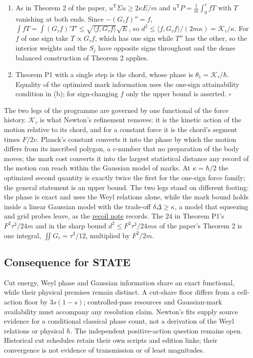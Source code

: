 \documentclass[11pt,a4paper]{article}
\begin{document}
\begin{enumerate}
\def\labelenumi{(\alph{enumi})}
\setcounter{enumi}{1}
\item
  As in Theorem 2 of the paper, \(u^{\mathsf T}\Sigma u\ge2\kappa E/m\)
  and \(u^{\mathsf T}P=\frac1m\int_0^\tau fT\) with \(T\) vanishing at
  both ends. Since \(-(G_\tau f)''=f\),
  \(\int fT=\int(G_\tau f)'T'\le\sqrt{\langle f,G_\tau f\rangle}\sqrt E\),
  so
  \(d^2\le\langle f,G_\tau f\rangle/(2m\kappa)=\mathcal K_\tau/\kappa\).
  For \(f\) of one sign take \(T\propto G_\tau f\), which has one sign
  while \(T''\) has the other, so the interior weights and the \(S_j\)
  have opposite signs throughout and the dense balanced construction of
  Theorem 2 applies.
\item
  Theorem P1 with a single step is the chord, whose phase is
  \(\theta_1=\mathcal K_\tau/\hbar\). Equality of the optimized mark
  information uses the one-sign attainability condition in (b); for
  sign-changing \(f\) only the upper bound is asserted. \(\square\)
\end{enumerate}

The two legs of the programme are governed by one functional of the
force history. \(\mathcal K_\tau\) is what Newton's refinement removes:
it is the kinetic action of the motion relative to its chord, and for a
constant force it is the chord's segment times \(F/2v\). Planck's
constant converts it into the phase by which the motion differs from its
inscribed polygon, a c-number that no preparation of the body moves; the
mark cost converts it into the largest statistical distance any record
of the motion can reach within the Gaussian model of marks. At
\(\kappa=\hbar/2\) the optimized second quantity is exactly twice the
first for the one-sign force family; the general statement is an upper
bound. The two legs stand on different footing: the phase is exact and
uses the Weyl relations alone, while the mark bound holds inside a
linear Gaussian model with the trade-off \(\delta\Delta\ge\kappa\), a
model that squeezing and grid probes leave, as the
\href{record-distance-path-length.md\#recoil-only-bound-for-arbitrary-probe-states}{recoil
note} records. The \(24\) in Theorem P1's \(F^2\tau^3/24m\) and in the
sharp bound \(d^2\le F^2\tau^3/24m\kappa\) of the paper's Theorem 2 is
one integral, \(\iint G_\tau=\tau^3/12\), multiplied by \(F^2/2m\).

\hypertarget{consequence-for-state}{%
\subsection{Consequence for STATE}\label{consequence-for-state}}

Cut energy, Weyl phase and Gaussian information share an exact
functional, while their physical premises remain distinct. A cut-share
floor differs from a cell-action floor by \(3s(1-s)\); controlled-pass
resources and Gaussian-mark availability must accompany any resolution
claim. Newton's fits supply source evidence for a conditional classical
phase count, not a derivation of the Weyl relations or physical
\(\hbar\). The independent positive-action question remains open.
Historical cut schedules retain their own scripts and edition links;
their convergence is not evidence of transmission or of least
magnitudes.
\end{document}
